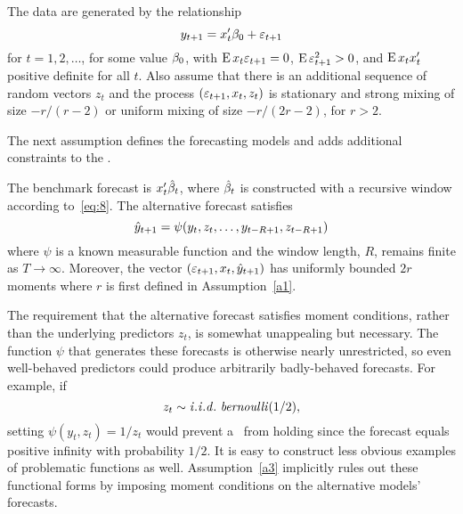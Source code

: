 \documentclass[12pt,fleqn]{article}
\providecommand\phantomsection{}
\begin{document}
\phantomsection
{}
\begin{asmp}\label{a1}%
  The data are generated by the relationship
  \begin{equation}
    y_{t+1} = x_t'\btrue + \ep_{t+1}
  \end{equation}
  for $t=1,2,\dots$, for some value $\btrue$, with $\operatorname{E} x_t \varepsilon_{t+1} =
  0$, $\operatorname{E} \varepsilon_{t+1}^2 > 0$, and $\operatorname{E} x_t x_t'$ positive definite for
  all $t$. Also assume that there is an additional sequence of random
  vectors $z_t$ and the process $(\varepsilon_{t+1}, x_t, z_t)$ is stationary
  and strong mixing of size $-r/(r-2)$ or uniform mixing of size
  $-r/(2r-2)$, for $r > 2$.
\end{asmp}

The next assumption defines the forecasting models and adds additional
constraints to the \dgp.

\phantomsection
{}
\begin{asmp}\label{a3}%
  The benchmark forecast is $x_t'\hat{\beta}_t$, where $\hat{\beta}_t$ is constructed
  with a recursive window according to~\eqref{eq:8}. The alternative
  forecast satisfies
  \begin{equation}
    \hat{y}_{t+1} = \psi(y_t,z_t,\dots,y_{t-R+1}, z_{t-R+1})
  \end{equation}
  where $\psi$ is a known measurable function and the window length,
  $R$, remains finite as $T \to \infty$. Moreover, the vector
  $(\varepsilon_{t+1}, x_t, \hat{y}_{t+1})$ has uniformly bounded $2 r$ moments
  where $r$ is first defined in Assumption~\ref{a1}.
\end{asmp}

The requirement that the alternative forecast satisfies moment
conditions, rather than the underlying predictors $z_t$, is somewhat
unappealing but necessary. The function $\psi$ that generates these
forecasts is otherwise nearly unrestricted, so even well-behaved predictors
could produce arbitrarily badly-behaved forecasts. For example, if
\begin{equation*}
  z_t \sim \mathit{i.i.d.}~\mathit{bernoulli}(1/2),
\end{equation*}
setting $\psi(y_t, z_t) = 1/z_t$ would prevent a \clt\ from holding
since the forecast equals positive infinity with probability $1/2$. It
is easy to construct less obvious examples of problematic functions as
well. Assumption~\ref{a3} implicitly rules out these functional forms
by imposing moment conditions on the alternative models' forecasts.
\end{document}
